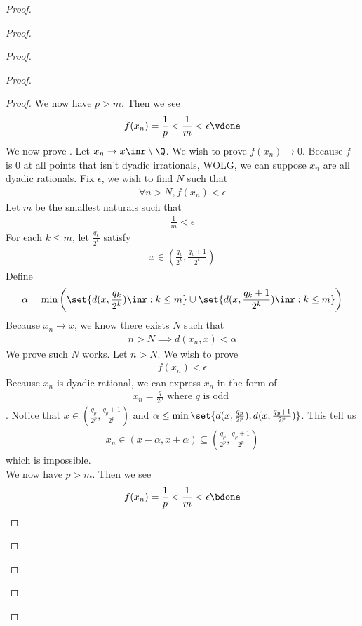 \documentclass{report}
\begin{document}
\begin{proof}
\begin{proof}
\begin{proof}
\begin{proof}
\begin{proof}
We now have $p>m$. Then we see 
 \begin{align*}
f(x_n)=\frac{1}{p}<\frac{1}{m}<\epsilon \vdone
\end{align*}
We now prove . Let $x_n\to x\inr\setminus \Q$. We wish to prove $f(x_n)\to 0$. Because $f$ is  $0$ at all points that isn't dyadic irrationals, WOLG, we can suppose  $x_n$ are all dyadic rationals. Fix  $\epsilon $, we wish to find $N$ such that 
 \begin{align*}
\forall n>N, f(x_n)<\epsilon 
\end{align*}
Let $m$ be the smallest naturals such that 
 \begin{align*}
\frac{1}{m}<\epsilon 
\end{align*}
For each $k\leq m$, let $\frac{q_k}{2^k}$ satisfy 
\begin{align*}
x\in (\frac{q_k}{2^k},\frac{q_k+1}{2^k})
\end{align*}
Define 
\begin{align*}
\alpha = \min \bigg( \set{d(x,\frac{q_k}{2^k})\inr:k\leq m } \cup \set{d(x,\frac{q_k+1}{2^k})\inr:k\leq m}\bigg)
\end{align*}
Because $x_n\to x$, we know there exists $N$ such that 
 \begin{align*}
n>N\implies d(x_n,x)<\alpha 
\end{align*}
We prove such $N$ works. Let $n>N$. We wish to prove 
 \begin{align*}
f(x_n)<\epsilon 
\end{align*}
Because $x_n$ is dyadic rational, we can express $x_n$ in the form of 
 \begin{align*}
x_n=\frac{q}{2^p}\text{ where $q$ is odd }
\end{align*}
. Notice that $x\in (\frac{q_p}{2^p},\frac{q_p+1}{2^p})$ and $\alpha \leq \min \set{d(x,\frac{q_p}{2^p}),d(x,\frac{q_p+1}{2^p})}$. This tell us 
\begin{align*}
x_n\in (x-\alpha ,x+\alpha )\subseteq (\frac{q_p}{2^p},\frac{q_p+1}{2^p})
\end{align*}
which is impossible. \CaC\\

We now have $p>m$. Then we see 
 \begin{align*}
f(x_n)=\frac{1}{p}<\frac{1}{m}<\epsilon \bdone
\end{align*}





\end{proof}
\begin{question}{}{}


\end{question}
\end{proof}
\end{proof}
\end{proof}
\end{proof}
\end{document}
